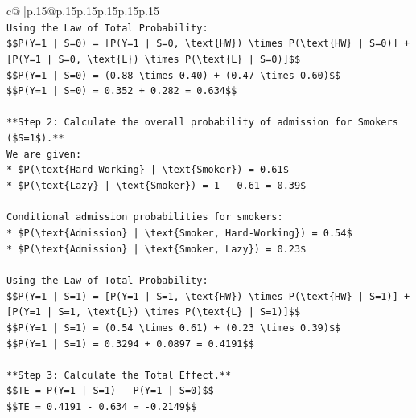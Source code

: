 \documentclass{article}
\begin{document}
{\begin{supertabular}{c@{$\;$}|p{.15\linewidth}@{}p{.15\linewidth}p{.15\linewidth}p{.15\linewidth}p{.15\linewidth}p{.15\linewidth}}
{{{\\ 
\texttt{Using the Law of Total Probability:} \\
\texttt{\$\$P(Y=1 | S=0) = {[}P(Y=1 | S=0, \textbackslash{}text\{HW\}) \textbackslash{}times P(\textbackslash{}text\{HW\} | S=0){]} + {[}P(Y=1 | S=0, \textbackslash{}text\{L\}) \textbackslash{}times P(\textbackslash{}text\{L\} | S=0){]}\$\$} \\
\texttt{\$\$P(Y=1 | S=0) = (0.88 \textbackslash{}times 0.40) + (0.47 \textbackslash{}times 0.60)\$\$} \\
\texttt{\$\$P(Y=1 | S=0) = 0.352 + 0.282 = 0.634\$\$} \\
\\ 
\texttt{**Step 2: Calculate the overall probability of admission for Smokers (\$S=1\$).**} \\
\texttt{We are given:} \\
\texttt{*   \$P(\textbackslash{}text\{Hard{-}Working\} | \textbackslash{}text\{Smoker\}) = 0.61\$} \\
\texttt{*   \$P(\textbackslash{}text\{Lazy\} | \textbackslash{}text\{Smoker\}) = 1 {-} 0.61 = 0.39\$} \\
\\ 
\texttt{Conditional admission probabilities for smokers:} \\
\texttt{*   \$P(\textbackslash{}text\{Admission\} | \textbackslash{}text\{Smoker, Hard{-}Working\}) = 0.54\$} \\
\texttt{*   \$P(\textbackslash{}text\{Admission\} | \textbackslash{}text\{Smoker, Lazy\}) = 0.23\$} \\
\\ 
\texttt{Using the Law of Total Probability:} \\
\texttt{\$\$P(Y=1 | S=1) = {[}P(Y=1 | S=1, \textbackslash{}text\{HW\}) \textbackslash{}times P(\textbackslash{}text\{HW\} | S=1){]} + {[}P(Y=1 | S=1, \textbackslash{}text\{L\}) \textbackslash{}times P(\textbackslash{}text\{L\} | S=1){]}\$\$} \\
\texttt{\$\$P(Y=1 | S=1) = (0.54 \textbackslash{}times 0.61) + (0.23 \textbackslash{}times 0.39)\$\$} \\
\texttt{\$\$P(Y=1 | S=1) = 0.3294 + 0.0897 = 0.4191\$\$} \\
\\ 
\texttt{**Step 3: Calculate the Total Effect.**} \\
\texttt{\$\$TE = P(Y=1 | S=1) {-} P(Y=1 | S=0)\$\$} \\
\texttt{\$\$TE = 0.4191 {-} 0.634 = {-}0.2149\$\$} \\
}}}
\end{supertabular}}
\end{document}
